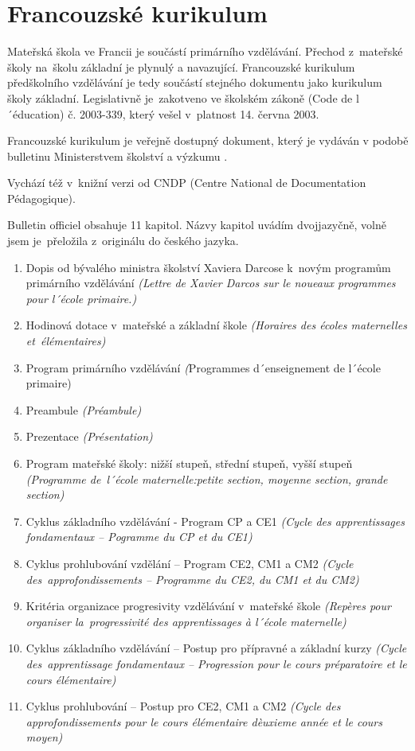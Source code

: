 	\section{Francouzské kurikulum}

		Mateřská škola ve Francii je součástí primárního vzdělávání. Přechod z mateřské školy na školu základní je plynulý a navazující. Francouzské kurikulum předškolního vzdělávání je tedy součástí stejného dokumentu jako kurikulum školy základní. Legislativně je zakotveno ve školském zákoně (Code de l´éducation) č. 2003-339, který vešel v platnost 14. června 2003.
	
		Francouzské kurikulum je veřejně dostupný dokument, který je vydáván v podobě bulletinu Ministerstvem školství a výzkumu \citep{buletin}.

		Vychází též v knižní verzi od CNDP (Centre National de Documentation Pédagogique)\citep{CNDP}.

		Bulletin officiel obsahuje 11 kapitol. Názvy kapitol uvádím dvojjazyčně, volně jsem je přeložila z originálu do českého jazyka.

	\begin{enumerate}[1]
		\item Dopis od bývalého ministra školství Xaviera Darcose k novým programům primárního vzdělávání \textit{(Lettre de Xavier Darcos sur le noueaux programmes pour l´école primaire.)}
		\item Hodinová dotace v mateřské a základní škole \textit{(Horaires des écoles maternelles et élémentaires)}
		\item Program primárního vzdělávání \textit({Programmes d´enseignement  de l´école primaire)}
		\item Preambule \textit{(Préambule)}
		\item Prezentace \textit{(Présentation)}
		\item Program mateřské školy: nižší stupeň, střední stupeň, vyšší stupeň \textit{(Programme de l´école maternelle:petite section, moyenne section, grande section)}
		\item Cyklus základního vzdělávání - Program CP a CE1 \textit{(Cycle des apprentissages fondamentaux – Pogramme du CP et du CE1)}
		\item Cyklus prohlubování vzdělání – Program CE2, CM1 a CM2 \textit{(Cycle des approfondissements – Programme du CE2, du CM1 et du CM2)}
		\item Kritéria organizace progresivity vzdělávání v mateřské škole \textit{(Repères pour organiser la progressivité des apprentissages à l´école maternelle)}
		\item Cyklus základního vzdělávání – Postup pro přípravné a základní kurzy \textit{(Cycle des apprentissage fondamentaux – Progression pour le cours préparatoire et le cours élémentaire)}
		\item Cyklus prohlubování – Postup pro CE2, CM1 a CM2 \textit{(Cycle des approfondissements pour le cours élémentaire dèuxieme année et le cours moyen)}
	\end{enumerate}


